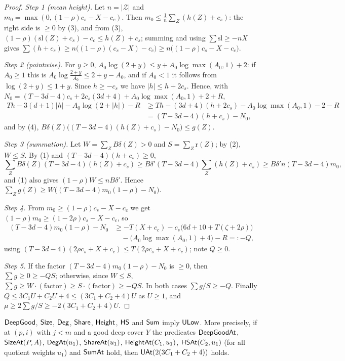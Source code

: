 \begin{proof}
\emph{Step 1 (mean height).} Let $n=|\mathcal Z|$ and $m_0=\max(0,(1-\rho)c_s-X-c_c)$. Then
$m_0\le\frac1n\sum_Z(h(Z)+c_s)$: the right side is
$\ge0$ by (3), and from (3), $(1-\rho)(\mathrm{sl}(Z)+c_s)-c_c\le h(Z)+c_s$; summing and using
$\sum\mathrm{sl}\ge-nX$ gives $\sum(h+c_s)\ge n\bigl((1-\rho)(c_s-X)-c_c\bigr)\ge n\bigl((1-\rho)c_s-X-c_c\bigr)$.

\emph{Step 2 (pointwise).} For $y\ge0$, $A_0\log(2+y)\le y+A_0\log\max(A_0,1)+2$: if $A_0\ge1$ this is
$A_0\log\frac{2+y}{A_0}\le2+y-A_0$, and if $A_0<1$ it follows from $\log(2+y)\le1+y$. Since $h\ge-c_s$ we have
$|h|\le h+2c_s$. Hence, with $N_0=(T-3d-4)c_s+2c_s(3d+4)+A_0\log\max(A_0,1)+2+R$,
\begin{align*}
Th-3(d+1)|h|-A_0\log(2+|h|)-R&\ge Th-(3d+4)(h+2c_s)-A_0\log\max(A_0,1)-2-R\\
&=(T-3d-4)(h+c_s)-N_0,
\end{align*}
and by (4), $B\delta(Z)\bigl((T-3d-4)(h(Z)+c_s)-N_0\bigr)\le g(Z)$.

\emph{Step 3 (summation).} Let $W=\sum_ZB\delta(Z)>0$ and $S=\sum_Z\mathrm r(Z)$; by (2), $W\le S$. By (1) and
$(T-3d-4)(h+c_s)\ge0$,
\[
\sum_ZB\delta(Z)(T-3d-4)(h(Z)+c_s)\ge B\delta'(T-3d-4)\sum_Z(h(Z)+c_s)\ge B\delta'n(T-3d-4)m_0,
\]
and (1) also gives $(1-\rho)W\le nB\delta'$. Hence $\sum_Zg(Z)\ge W\bigl((T-3d-4)m_0(1-\rho)-N_0\bigr)$.

\emph{Step 4.} From $m_0\ge(1-\rho)c_s-X-c_c$ we get $(1-\rho)m_0\ge(1-2\rho)c_s-X-c_c$, so
\begin{align*}
(T-3d-4)m_0(1-\rho)-N_0&\ge-T(X+c_c)-c_s\bigl(6d+10+T(\zeta+2\rho)\bigr)\\
&\quad-\bigl(A_0\log\max(A_0,1)+4\bigr)-R=:-Q,
\end{align*}
using $(T-3d-4)(2\rho c_s+X+c_c)\le T(2\rho c_s+X+c_c)$; note $Q\ge0$.

\emph{Step 5.} If the factor $(T-3d-4)m_0(1-\rho)-N_0$ is $\ge0$, then $\sum g\ge0\ge-QS$; otherwise, since $W\le S$,
$\sum g\ge W\cdot(\text{factor})\ge S\cdot(\text{factor})\ge-QS$. In both cases $\sum g/S\ge-Q$.
Finally $Q\le3C_1U+C_2U+4\le(3C_1+C_2+4)U$ as $U\ge1$, and $\mu\ge2\sum g/S\ge-2(3C_1+C_2+4)U$.
\end{proof}

\begin{proposition}\label{pf:lift2:ulow}
$\mathsf{DeepGood}$, $\mathsf{Size}$, $\mathsf{Deg}$, $\mathsf{Share}$, $\mathsf{Height}$, $\mathsf{HS}$ and
$\mathsf{Sum}$ imply $\mathsf{ULow}$. More precisely, if at $(p,i)$ with $j<m$ and a good deep cover $Y$ the
predicates $\mathsf{DeepGoodAt}$, $\mathsf{SizeAt}(P,A)$, $\mathsf{DegAt}(u_1)$, $\mathsf{ShareAt}(u_1)$,
$\mathsf{HeightAt}(C_1,u_1)$, $\mathsf{HSAt}(C_2,u_1)$ (for all quotient weights $u_1$) and $\mathsf{SumAt}$ hold,
then $\mathsf{UAt}(2(3C_1+C_2+4))$ holds.
\end{proposition}


